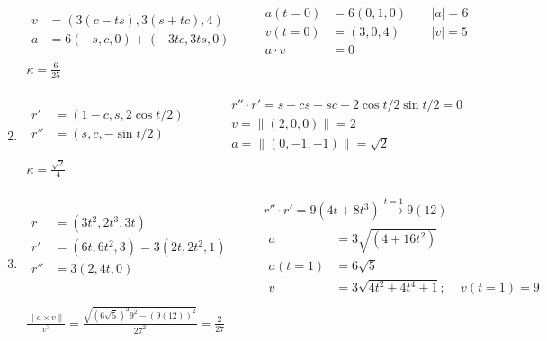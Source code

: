 \documentclass[twoside]{amsart}
\theoremstyle{plain}
\theoremstyle{definition}
\begin{document}
\begin{enumerate}
\[\begin{gathered}
\begin{aligned}
    v & = (3(c-ts), 3(s+tc), 4) \\
    a & = 6(-s,c,0) + (-3tc,3ts, 0)
  \end{aligned} \quad \quad 
  \begin{aligned}
    a(t=0) & = 6(0,1,0) \quad \, & |a| = 6 \\
    v(t=0) & = (3,0,4) \quad \, & |v| = 5 \\
    a\cdot v & = 0 
  \end{aligned} \\
  \boxed{ \kappa = \frac{6}{25} }
\end{gathered}
\]
\item \[
\begin{gathered}
  \begin{aligned}
    r' & = (1-c,s,2\cos{t/2} ) \\
    r'' & = (s,c,-\sin{t/2} ) 
  \end{aligned}  \quad \quad \, 
  \begin{aligned}
    & r'' \cdot r' = s - cs + sc - 2\cos{t/2}\sin{t/2} = 0 \\
    & v = \| (2,0,0) \| = 2 \\
    & a = \| (0,-1,-1) \| =\sqrt{2} 
  \end{aligned} \\
  \boxed{ \kappa = \frac{ \sqrt{2}}{4 } }
\end{gathered}
\]
\item \[
  \begin{gathered}
    \begin{aligned}
      r & = (3t^2,2t^3,3t) \\
      r' & = (6t,6t^2, 3) = 3(2t,2t^2,1 ) \\
      r'' & = 3(2,4t,0) \\
    \end{aligned} \quad \quad \, 
    \begin{gathered} 
      r'' \cdot r' = 9 (4t+ 8t^3) \xrightarrow{ t= 1 } 9 (12) \\
    \begin{aligned}
      a & = 3 \sqrt{ (4 + 16t^2 ) } \\
      a(t=1) & = 6 \sqrt{5} \\
      v & = 3 \sqrt{ 4t^2 + 4t^4 + 1 }; \quad \, v(t=1) = 9 
    \end{aligned} 
    \end{gathered} \\
    \frac{ \| a \times v \| }{ v^3 } = \frac{ \sqrt{ (6 \sqrt{5})^2 9^2 - (9(12))^2 } }{ 27^2 } = \boxed{ \frac{2}{27} }

\end{gathered}\]
\end{enumerate}
\end{document}
